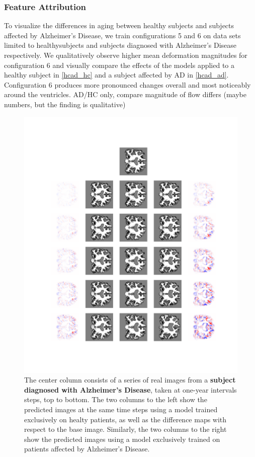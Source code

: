 \subsubsection*{Feature Attribution}
To visualize the differences in aging between healthy subjects and subjects affected by Alzheimer's Disease, we train configurations 5 and 6 on data sets limited to healthysubjects and subjects diagnosed with Alzheimer's Disease respectively. We qualitatively observe higher mean deformation magnitudes for configuration 6 and visually compare the effects of the models applied to a healthy subject in \autoref{hcad_hc} and a subject affected by AD in \autoref{hcad_ad}. Configuration 6 produces more pronounced changes overall and most noticeably around the ventricles.
AD/HC only, compare
magnitude of flow differs (maybe numbers, but the finding is qualitative)

\begin{figure}
	\centering
	\includegraphics[width=\linewidth, trim={100 100 66 30}, clip]{images/HC_AD_plots/comp_ADNI_141445}
	\vspace*{-15pt}
	\caption{The center column consists of a series of real images from a \textbf{subject diagnosed with Alzheimer's Disease}, taken at one-year intervals steps, top to bottom. The two columns to the left show the predicted images at the same time steps using a model trained exclusively on healty patients, as well as the difference maps with respect to the base image. Similarly, the two columns to the right show the predicted images using a model exclusively trained on patients affected by Alzheimer's Disease.}
	\label{fig:hcad_ad} %
\end{figure}

